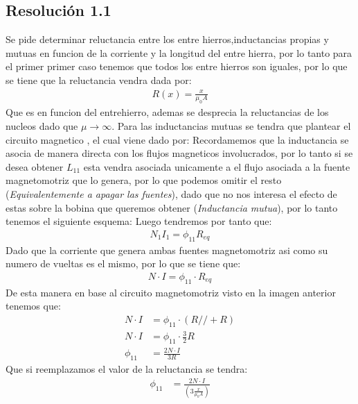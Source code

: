 \documentclass[
  11pt,
  letterpaper,
   addpoints,
   answers
  ]{exam}
\begin{document}
\begin{questions}
\begin{solution}
        \subsection*{Resolución 1.1}
        Se pide determinar reluctancia entre los entre hierros,inductancias propias y mutuas en funcion de la corriente y la longitud del entre hierra, por lo tanto para el primer primer caso tenemos que todos los entre hierros son iguales, por lo que se tiene que la reluctancia vendra dada por:
        \begin{align}
            R(x) = \frac{x}{\mu_{0}A}
        \end{align}
        Que es en funcion del entrehierro, ademas se desprecia la reluctancias de los nucleos dado que $\mu \rightarrow \infty$. Para las inductancias mutuas se tendra que plantear el circuito magnetico , el cual viene dado por:
        Recordamemos que la inductancia se asocia de manera directa con los flujos magneticos involucrados, por lo tanto si se desea obtener $L_{11}$ esta vendra asociada unicamente a el flujo asociada a la fuente magnetomotriz que lo genera, por lo que podemos omitir el resto (\textit{Equivalentemente a apagar las fuentes}), dado que no nos interesa el efecto de estas sobre la bobina que queremos obtener (\textit{Inductancia mutua}), por lo tanto tenemos el siguiente esquema:
        Luego tendremos por tanto que:
        \begin{align}
            N_{1}I_{1}= \phi_{11}R_{eq}
        \end{align}
        Dado que la corriente que genera ambas fuentes magnetomotriz asi como su numero de vueltas es el mismo, por lo que se tiene que:
        \begin{align}
            N \cdot I = \phi_{11} \cdot R_{eq}
        \end{align}
        De esta manera en base al circuito magnetomotriz visto en la imagen anterior tenemos que:
        \begin{align}
            N \cdot I &= \phi_{11} \cdot (R// + R)\\
            N \cdot I &= \phi_{11} \cdot \frac{3}{2}R\\
            \phi_{11} &= \frac{2N \cdot I}{3R}
        \end{align}
        Que si reemplazamos el valor de la reluctancia se tendra:
        \begin{align}
            \phi_{11} &= \frac{2N \cdot I}{\left(3\frac{x}{\mu_{0}A}\right)}\\

\end{align}
\end{solution}
\end{questions}
\end{document}
